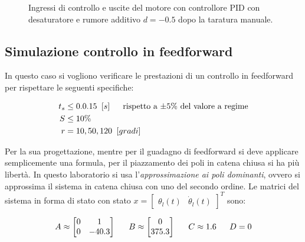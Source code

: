 		\begin{figure}[H]
			\centering
			 
			\caption{Ingressi di controllo e uscite del motore con controllore PID con desaturatore e rumore additivo $d=-0.5$ dopo la taratura manuale.}
			\label{fig:PIDd__0_5}		
		\end{figure}		
		
		
		
	
	
	
	
	
		
	\subsection{Simulazione controllo in feedforward}	
	\label{subsec:feedforwardSim}
	
		In questo caso si vogliono verificare le prestazioni di un controllo in feedforward per rispettare le seguenti specifiche:

		\begin{align*}
			t_s &\le 0.0.15 \singleSpacing [s] \trippleSpacing \textnormal{rispetto a $\pm 5 \%$ del valore a regime} \\
			S &\le 10  \% \\
			r &= 10,50,120 \singleSpacing [gradi] \\
		\end{align*}	
		
		\noindent Per la sua progettazione, mentre per il guadagno di feedforward si deve applicare semplicemente una formula, per il piazzamento dei poli in catena chiusa si ha più libertà. In questo laboratorio si usa l'\textit{approssimazione ai poli dominanti}, ovvero si approssima il sistema in catena chiusa con uno del secondo ordine. Le matrici del sistema in forma di stato con stato $x=\begin{bmatrix}\theta_l(t) & \dot{\theta}_l(t)\end{bmatrix}^T$ sono:
		
		\begin{align*}
			A\approx
			\begin{bmatrix}
				0 & 1     \\
				0 & -40.3 \\
			\end{bmatrix}
			\trippleSpacing
			B\approx
			\begin{bmatrix}
				0     \\
				375.3 \\
			\end{bmatrix}
			\trippleSpacing
			C\approx 1.6
			\trippleSpacing
			D=0
		\end{align*}
		
